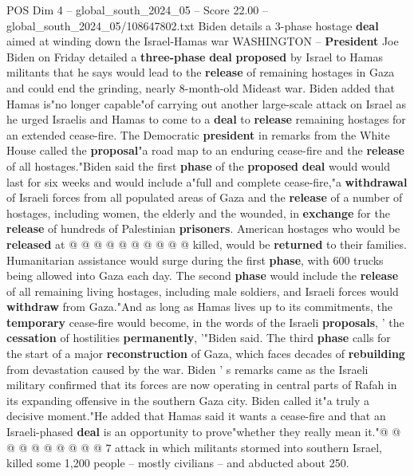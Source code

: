 \begin{textsample}{POS Dim 4 – global\_south\_2024\_05 – Score 22.00 – global\_south\_2024\_05/108647802.txt}  \label{ex:f4_pos_188}
Biden details a 3-phase hostage \textbf{deal} aimed at winding down the Israel-Hamas war WASHINGTON -- \textbf{President} Joe Biden on Friday detailed a \textbf{three-phase} \textbf{deal} \textbf{proposed} by Israel to Hamas militants that he says would lead to the \textbf{release} of remaining hostages in Gaza and could end the grinding, nearly 8-month-old Mideast war.
Biden added that Hamas is"no longer capable"of carrying out another large-scale attack on Israel as he urged Israelis and Hamas to come to a \textbf{deal} to \textbf{release} remaining hostages for an extended cease-fire.
The Democratic \textbf{president} in remarks from the White House called the \textbf{proposal}"a road map to an enduring cease-fire and the \textbf{release} of all hostages."Biden said the first \textbf{phase} of the \textbf{proposed} \textbf{deal} would would last for six weeks and would include a"full and complete cease-fire,"a \textbf{withdrawal} of Israeli forces from all populated areas of Gaza and the \textbf{release} of a number of hostages, including women, the elderly and the wounded, in \textbf{exchange} for the \textbf{release} of hundreds of Palestinian \textbf{prisoners}.
American hostages who would be \textbf{released} at @ @ @ @ @ @ @ @ @ @ killed, would be \textbf{returned} to their families.
Humanitarian assistance would surge during the first \textbf{phase}, with 600 trucks being allowed into Gaza each day.
The second \textbf{phase} would include the \textbf{release} of all remaining living hostages, including male soldiers, and Israeli forces would \textbf{withdraw} from Gaza."And as long as Hamas lives up to its commitments, the \textbf{temporary} cease-fire would become, in the words of the Israeli \textbf{proposals}, ' the \textbf{cessation} of hostilities \textbf{permanently}, '"Biden said.
The third \textbf{phase} calls for the start of a major \textbf{reconstruction} of Gaza, which faces decades of \textbf{rebuilding} from devastation caused by the war.
Biden ' s remarks came as the Israeli military confirmed that its forces are now operating in central parts of Rafah in its expanding offensive in the southern Gaza city.
Biden called it"a truly a decisive moment."He added that Hamas said it wants a cease-fire and that an Israeli-phased \textbf{deal} is an opportunity to prove"whether they really mean it."@ @ @ @ @ @ @ @ @ @ 7 attack in which militants stormed into southern Israel, killed some 1,200 people -- mostly civilians -- and abducted about 250.

\end{textsample}
